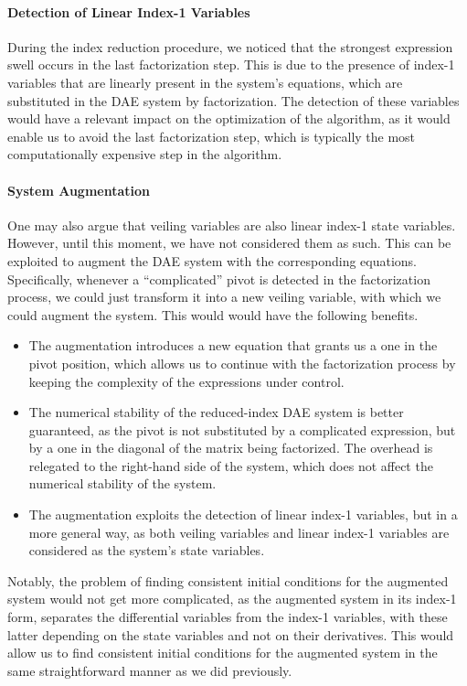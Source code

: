 \paragraph{Detection of Linear Index-1 Variables}

During the index reduction procedure, we noticed that the strongest expression swell occurs in the last factorization step. This is due to the presence of index-1 variables that are linearly present in the system's equations, which are substituted in the \ac{DAE} system by factorization. The detection of these variables would have a relevant impact on the optimization of the algorithm, as it would enable us to avoid the last factorization step, which is typically the most computationally expensive step in the algorithm.

\paragraph{System Augmentation}

One may also argue that veiling variables are also linear index-1 state variables. However, until this moment, we have not considered them as such. This can be exploited to augment the \ac{DAE} system with the corresponding equations. Specifically, whenever a ``complicated'' pivot is detected in the factorization process, we could just transform it into a new veiling variable, with which we could augment the system. This would would have the following benefits.
%
\begin{itemize}
  \setlength{\itemsep}{0pt}
  \item The augmentation introduces a new equation that grants us a one in the pivot position, which allows us to continue with the factorization process by keeping the complexity of the expressions under control.
  \item The numerical stability of the reduced-index \ac{DAE} system is better guaranteed, as the pivot is not substituted by a complicated expression, but by a one in the diagonal of the matrix being factorized. The overhead is relegated to the right-hand side of the system, which does not affect the numerical stability of the system.
  \item The augmentation exploits the detection of linear index-1 variables, but in a more general way, as both veiling variables and linear index-1 variables are considered as the system's state variables.
\end{itemize}

Notably, the problem of finding consistent initial conditions for the augmented system would not get more complicated, as the augmented system in its index-1 form, separates the differential variables from the index-1 variables, with these latter depending on the state variables and not on their derivatives. This would allow us to find consistent initial conditions for the augmented system in the same straightforward manner as we did previously.


